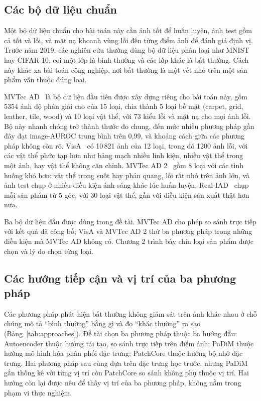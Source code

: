 \subsection{Các bộ dữ liệu chuẩn}

Một bộ dữ liệu chuẩn cho bài toán này cần ảnh tốt để huấn luyện, ảnh test gồm cả tốt và lỗi, và mặt nạ khoanh vùng
lỗi đến từng điểm ảnh để đánh giá định vị. Trước năm 2019, các nghiên cứu thường dùng bộ dữ liệu phân loại như MNIST
hay CIFAR-10, coi một lớp là bình thường và các lớp khác là bất thường. Cách này khác xa bài toán công nghiệp, nơi
bất thường là một vết nhỏ trên một sản phẩm vẫn thuộc đúng loại.

MVTec AD~\cite{bergmannMVTecADComprehensive2019} là bộ dữ liệu đầu tiên được xây dựng riêng cho bài toán này, gồm
5354 ảnh độ phân giải cao của 15 loại, chia thành 5 loại bề mặt (carpet, grid, leather, tile, wood) và 10 loại vật
thể, với 73 kiểu lỗi và mặt nạ cho mọi ảnh lỗi. Bộ này nhanh chóng trở thành thước đo chung, đến mức nhiều phương pháp
gần đây đạt image-AUROC trung bình trên 0,99, và khoảng cách giữa các phương pháp không còn rõ.
VisA~\cite{zouSPotDifferenceSelfsupervisedPretraining2022} có 10\,821 ảnh của 12 loại, trong đó 1200 ảnh lỗi, với các
vật thể phức tạp hơn như bảng mạch nhiều linh kiện, nhiều vật thể trong một ảnh, hay vật thể không căn chỉnh. MVTec
AD 2~\cite{hecklerkramMVTecAD2Dataset2026} gồm 8 loại với các tình huống khó hơn: vật thể trong suốt hay phản quang,
lỗi rất nhỏ trên ảnh lớn, và ảnh test chụp ở nhiều điều kiện ánh sáng khác lúc huấn luyện. Real-IAD~\cite{wangRealIADRealWorldMultiView2024}
chụp mỗi sản phẩm từ 5 góc, với 30 loại vật thể, gần với điều kiện sản xuất thật hơn nữa.

Ba bộ dữ liệu đầu được dùng trong đề tài. MVTec AD cho phép so sánh trực tiếp với kết quả đã công bố; VisA và MVTec AD
2 thử ba phương pháp trong những điều kiện mà MVTec AD không có. Chương 2 trình bày chín loại sản phẩm được chọn và lý
do chọn từng loại.

\subsection{Các hướng tiếp cận và vị trí của ba phương pháp}

Các phương pháp phát hiện bất thường không giám sát trên ảnh khác nhau ở chỗ chúng mô tả ``bình thường'' bằng gì và
đo ``khác thường'' ra sao (Bảng~\ref{tab:approaches}). Đề tài chọn ba phương pháp thuộc ba hướng đầu: Autoencoder
thuộc hướng tái tạo, so sánh trực tiếp trên điểm ảnh; PaDiM thuộc hướng mô hình hóa phân phối đặc trưng; PatchCore
thuộc hướng bộ nhớ đặc trưng. Hai phương pháp sau cùng dựa trên đặc trưng học trước, nhưng PaDiM gắn thống kê với
từng vị trí còn PatchCore so sánh không phụ thuộc vị trí. Hai hướng còn lại được nêu để thấy vị trí của ba phương
pháp, không nằm trong phạm vi thực nghiệm.

